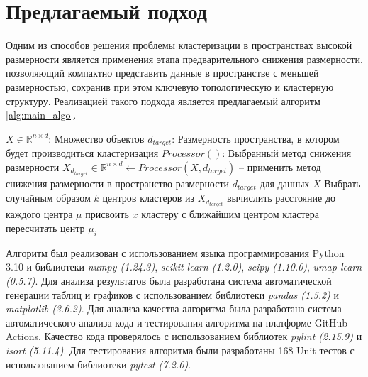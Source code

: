 \section{Предлагаемый подход}
    Одним из способов решения проблемы кластеризации в пространствах высокой размерности является применения этапа предварительного снижения размерности, позволяющий компактно представить данные в пространстве с меньшей размерностью, сохранив при этом ключевую топологическую и кластерную структуру. Реализацией такого подхода является предлагаемый алгоритм \ref{alg:main_algo}.

    \begin{algorithm}[H]
        \small
        \caption{Кластеризация с предварительным снижением размерности}
        \label{alg:main_algo}
        \begin{algorithmic}
            \State \(X \in \mathbb{R}^{n \times d}\): Множество объектов
            \State \(d_{target}\): Размерность пространства, в котором будет производиться кластеризация
            \State \(Processor()\): Выбранный метод снижения размерности
            \Statex
            \State \(X_{d_{target}} \in \mathbb{R}^{n \times d} \gets Processor(X, d_{target})\) -- применить метод снижения размерности в пространство размерности \(d_{target}\) для данных \(X\)
            \State Выбрать случайным образом \(k\) центров кластеров из \(X_{d_{target}}\)
                    \State вычислить расстояние до каждого центра \(\mu\)
                    \State присвоить \(x\) кластеру с ближайшим центром кластера
                \EndFor
                    \State пересчитать центр \(\mu_i\)
                \EndFor
            \EndWhile
            \end{algorithmic}
    \end{algorithm}

    Алгоритм был реализован с использованием языка программирования Python 3.10 и библиотеки \textit{numpy (1.24.3)}, \textit{scikit-learn (1.2.0)}, \textit{scipy (1.10.0)}, \textit{umap-learn (0.5.7)}.
    Для анализа результатов была разработана система автоматической генерации таблиц и графиков с использованием библиотеки \textit{pandas (1.5.2)} и \textit{matplotlib (3.6.2)}.
    Для анализа качества алгоритма была разработана система автоматического анализа кода и тестирования алгоритма на платформе GitHub Actions. Качество кода проверялось с использованием библиотек \textit{pylint (2.15.9)} и \textit{isort (5.11.4)}. Для тестирования алгоритма были разработаны 168 Unit тестов с использованием библиотеки \textit{pytest (7.2.0)}.

